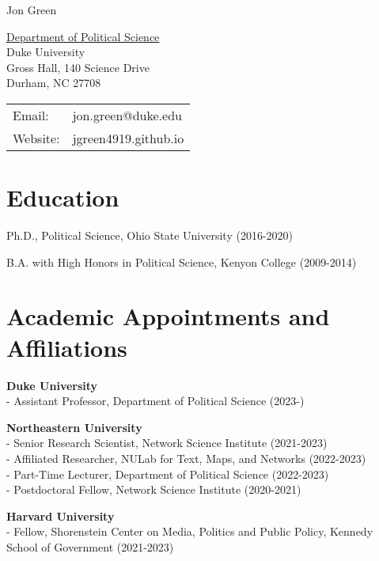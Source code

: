\documentclass[letterpaper]{article}
\def\name{Jon Green}
\renewenvironment{itemize}{
  \begin{list}{}{
    \setlength{\leftmargin}{1.5em}
  }
}{
  \end{list}
}
\begin{document}
{\huge \name}


\vspace{0.25in}

\begin{minipage}{0.45\linewidth}
  \href{https://polisci.duke.edu//}{Department of Political Science} \\
    Duke University \\
    Gross Hall, 140 Science Drive\\
  Durham, NC 27708
\end{minipage}
\begin{minipage}{0.45\linewidth}
  \begin{tabular}{ll}
    Email: & jon.green@duke.edu \\
    Website: & jgreen4919.github.io \\
  \end{tabular}
\end{minipage}

\section*{Education}

\begin{itemize}
    \item Ph.D., Political Science, Ohio State University (2016-2020)
	\item B.A. with High Honors in Political Science, Kenyon College (2009-2014)
\end{itemize}

\section*{Academic Appointments and Affiliations}
\begin{itemize}

\item \textbf{Duke University} \\
- Assistant Professor, Department of Political Science (2023-)

\item \textbf{Northeastern University} \\
- Senior Research Scientist, Network Science Institute (2021-2023)\\
- Affiliated Researcher, NULab for Text, Maps, and Networks (2022-2023) \\
- Part-Time Lecturer, Department of Political Science (2022-2023)\\
- Postdoctoral Fellow, Network Science Institute  (2020-2021)

\item \textbf{Harvard University} \\
- Fellow, Shorenstein Center on Media, Politics and Public Policy, Kennedy School of Government (2021-2023)

\end{itemize}
\end{document}
